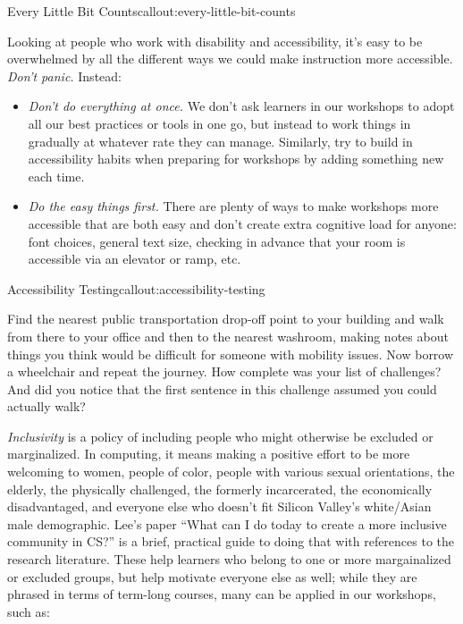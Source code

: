 \begin{callout}{Every Little Bit Counts}{callout:every-little-bit-counts}

Looking at people who work with disability and accessibility, it's easy
to be overwhelmed by all the different ways we could make instruction
more accessible. \emph{Don't panic.} Instead:

\begin{itemize}
\item
  \emph{Don't do everything at once.} We don't ask learners in our
  workshops to adopt all our best practices or tools in one go, but
  instead to work things in gradually at whatever rate they can manage.
  Similarly, try to build in accessibility habits when preparing for
  workshops by adding something new each time.
\item
  \emph{Do the easy things first.} There are plenty of ways to make
  workshops more accessible that are both easy and don't create extra
  cognitive load for anyone: font choices, general text size, checking
  in advance that your room is accessible via an elevator or ramp, etc.
\end{itemize}
\end{callout}

\begin{callout}{Accessibility Testing}{callout:accessibility-testing}

Find the nearest public transportation drop-off point to your building
and walk from there to your office and then to the nearest washroom,
making notes about things you think would be difficult for someone with
mobility issues. Now borrow a wheelchair and repeat the journey. How
complete was your list of challenges? And did you notice that the first
sentence in this challenge assumed you could actually walk?
\end{callout}


\emph{Inclusivity} is a policy of including people who might otherwise
be excluded or marginalized. In computing, it means making a positive
effort to be more welcoming to women, people of color, people with
various sexual orientations, the elderly, the physically challenged, the
formerly incarcerated, the economically disadvantaged, and everyone else
who doesn't fit Silicon Valley's white/Asian male demographic. Lee's
paper
``What can I do today to create a more inclusive community in CS?''
\cite{bib:lee-create-inclusive-community}
is a brief, practical guide to
doing that with references to the research literature. These help
learners who belong to one or more margainalized or excluded groups, but
help motivate everyone else as well; while they are phrased in terms of
term-long courses, many can be applied in our workshops, such as:

